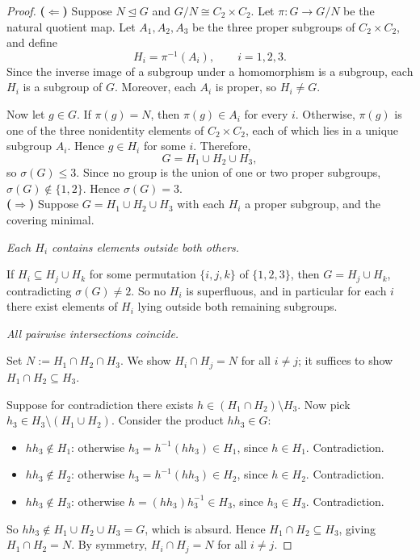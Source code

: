 \documentclass[12pt, a4paper]{article}
\theoremstyle{plain}
\theoremstyle{definition}
\begin{document}
\begin{proof}

\noindent\textbf{($\Leftarrow$)} 
Suppose \(N \trianglelefteq G\) and
\(G/N \cong C_2 \times C_2\). Let
\(\pi:G \to G/N\) be the natural quotient map. Let
\(A_1,A_2,A_3\) be the three proper subgroups of \(C_2 \times C_2\), and define
\[
H_i=\pi^{-1}(A_i), \qquad i=1,2,3.
\]
Since the inverse image of a subgroup under a homomorphism is a subgroup, each
\(H_i\) is a subgroup of \(G\). Moreover, each \(A_i\) is proper, so
\(H_i\neq G\).

Now let \(g\in G\). If \(\pi(g)=N\), then \(\pi(g)\in A_i\) for every \(i\).
Otherwise, \(\pi(g)\) is one of the three nonidentity elements of
\(C_2\times C_2\), each of which lies in a unique subgroup \(A_i\). Hence
\(g\in H_i\) for some \(i\). Therefore,
\[
G=H_1\cup H_2\cup H_3,
\]
so \(\sigma(G)\le3\). Since no group is the union of one or two proper
subgroups, \(\sigma(G)\notin\{1,2\}\). Hence \(\sigma(G)=3\).\\

\bigskip
\noindent\textbf{($\Rightarrow$)}
 Suppose $G = H_1 \cup H_2 \cup H_3$ with
each $H_i$ a proper subgroup, and the covering minimal.

\medskip
\noindent\textit{Each $H_i$ contains elements outside both others.}

If $H_i \subseteq H_j \cup H_k$ for some permutation $\{i,j,k\}$ of
$\{1,2,3\}$, then $G = H_j \cup H_k$, contradicting $\sigma(G) \neq 2$.
So no $H_i$ is superfluous, and in particular for each $i$ there exist
elements of $H_i$ lying outside both remaining subgroups.

\medskip
\noindent\textit{All pairwise intersections coincide.}

Set $N := H_1 \cap H_2 \cap H_3$. We show $H_i \cap H_j = N$ for all $i \neq j$;
it suffices to show $H_1 \cap H_2 \subseteq H_3$.

Suppose for contradiction there exists $h \in (H_1 \cap H_2) \setminus H_3$.
Now pick $h_3 \in H_3 \setminus (H_1 \cup H_2)$.
Consider the product $hh_3 \in G$:
\begin{itemize}
  \item $hh_3 \notin H_1$: otherwise $h_3 = h^{-1}(hh_3) \in H_1$,
    since $h \in H_1$. Contradiction.
  \item $hh_3 \notin H_2$: otherwise $h_3 = h^{-1}(hh_3) \in H_2$,
    since $h \in H_2$. Contradiction.
  \item $hh_3 \notin H_3$: otherwise $h = (hh_3)h_3^{-1} \in H_3$,
    since $h_3 \in H_3$. Contradiction.
\end{itemize}
So $hh_3 \notin H_1 \cup H_2 \cup H_3 = G$, which is absurd.
Hence $H_1 \cap H_2 \subseteq H_3$, giving $H_1 \cap H_2 = N$.
By symmetry, $H_i \cap H_j = N$ for all $i \neq j$.


\end{proof}
\end{document}
